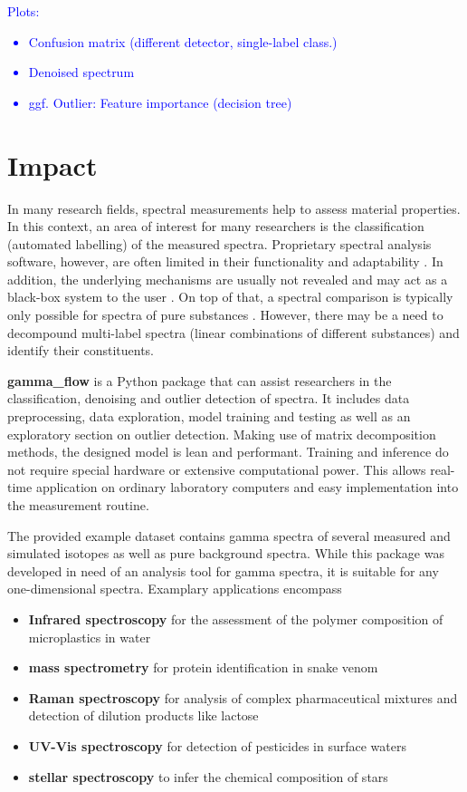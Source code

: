 \documentclass[preprint,12pt, a4paper]{elsarticle}
\begin{document}
\textcolor{blue}{
Plots: 
\begin{itemize}
	\item Confusion matrix (different detector, single-label class.)
	\item Denoised spectrum
	\item ggf. Outlier: Feature importance (decision tree)
\end{itemize}}


\section{Impact}
In many research fields, spectral measurements help to assess material properties. 
In this context, an area of interest for many researchers is the classification (automated labelling) of the measured spectra. Proprietary spectral analysis software, however, are often limited in their functionality and adaptability \cite{Lam2011, Nasereddin2023}. In addition, the underlying mechanisms are usually not revealed and may act as a black-box system to the user \cite{ElAmri2022}. On top of that, a spectral comparison is typically only possible for spectra of pure substances \cite{Cowger2021}. However, there may be a need to decompound multi-label spectra (linear combinations of different substances) and identify their constituents. 

\textbf{gamma\_flow} is a Python package that can assist researchers in the classification, denoising and outlier detection of spectra. It includes data preprocessing, data exploration, model training and testing as well as an exploratory section on outlier detection. Making use of matrix decomposition methods, the designed model is lean and performant. Training and inference do not require special hardware or extensive computational power. This allows real-time application on ordinary laboratory computers and easy implementation into the measurement routine. 

The provided example dataset contains gamma spectra of several measured and simulated isotopes as well as pure background spectra. While this package was developed in need of an analysis tool for gamma spectra, it is suitable for any one-dimensional spectra. Examplary applications encompass  
\begin{itemize}
\item \textbf{Infrared spectroscopy} for the assessment of the polymer composition of 
microplastics in water \cite{Ferreiro2023, Whiting2022}  
\item \textbf{mass spectrometry} for protein identification in snake venom 
\cite{Zelanis2019, Yasemin2021}  
\item \textbf{Raman spectroscopy} for analysis of complex pharmaceutical mixtures and detection
of dilution products like lactose \cite{Fu2021}  
\item \textbf{UV-Vis spectroscopy} for detection of pesticides in surface waters \cite{Guo2020, Qi2024}
\item \textbf{stellar spectroscopy} to infer the chemical composition of stars \cite{Gray2021}  
\end{itemize}
\end{document}
